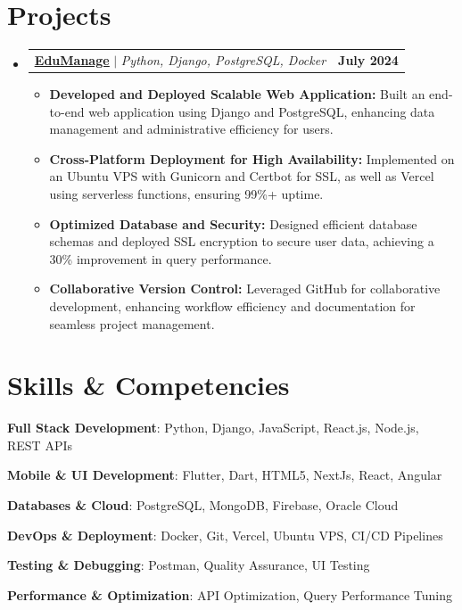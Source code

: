\documentclass[a4paper,11pt]{article}
\makeatletter
\newcommand{\resumeItem}[1]{
	\item\small{#1 \vspace{-2pt}}
}
\newcommand{\resumeProjectHeading}[2]{
		\item
		\begin{tabular*}{0.97\textwidth}{l@{\extracolsep{\fill}}r}
			\small#1 & \textbf{\small #2} \\
		\end{tabular*}\vspace{-7pt}
}
\newcommand{\resumeSubHeadingListStart}{\begin{itemize}[leftmargin=0.15in, label={}]}
\newcommand{\resumeSubHeadingListEnd}{\end{itemize}}
\newcommand{\resumeItemListStart}{\begin{itemize}}
\newcommand{\resumeItemListEnd}{\end{itemize}\vspace{-5pt}}
\makeatother
\begin{document}
\section{Projects}
\resumeSubHeadingListStart
\resumeProjectHeading
{\textbf{\href{https://github.com/ajmalbuv/EduManage}{\underline{EduManage}}} $|$ \emph{Python, Django, PostgreSQL, Docker}}{July 2024}
\resumeItemListStart
\resumeItem{\textbf{Developed and Deployed Scalable Web Application:} Built an end-to-end web application using Django and PostgreSQL, enhancing data management and administrative efficiency for users.}
\resumeItem{\textbf{Cross-Platform Deployment for High Availability:} Implemented on an Ubuntu VPS with Gunicorn and Certbot for SSL, as well as Vercel using serverless functions, ensuring 99\%+ uptime.}
\resumeItem{\textbf{Optimized Database and Security:} Designed efficient database schemas and deployed SSL encryption to secure user data, achieving a 30\% improvement in query performance.}
\resumeItem{\textbf{Collaborative Version Control:} Leveraged GitHub for collaborative development, enhancing workflow efficiency and documentation for seamless project management.}
\resumeItemListEnd
\resumeSubHeadingListEnd



\section{Skills \& Competencies}
\begin{itemize}[leftmargin=0.15in, label={}, itemsep=0pt]
    \small{
        \item \textbf{Full Stack Development}: Python, Django, JavaScript, React.js, Node.js, REST APIs
        \item \textbf{Mobile \& UI Development}: Flutter, Dart, HTML5, NextJs, React, Angular
        \item \textbf{Databases \& Cloud}: PostgreSQL, MongoDB, Firebase, Oracle Cloud
        \item \textbf{DevOps \& Deployment}: Docker, Git, Vercel, Ubuntu VPS, CI/CD Pipelines
        \item \textbf{Testing \& Debugging}: Postman, Quality Assurance, UI Testing
        \item \textbf{Performance \& Optimization}: API Optimization, Query Performance Tuning
    }
\end{itemize}
\end{document}
